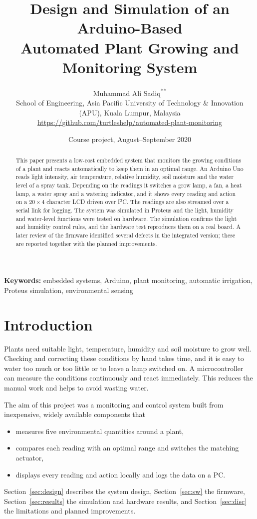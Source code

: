\documentclass[10pt,twocolumn,a4paper]{article}
\title{\vspace{-6mm}\Large\bfseries Design and Simulation of an Arduino-Based\\ Automated Plant Growing and Monitoring System}
\author{Muhammad Ali Sadiq\textsuperscript{**}\\
\small School of Engineering, Asia Pacific University of Technology \& Innovation (APU), Kuala Lumpur, Malaysia\\
\small \url{https://github.com/turtleshelp/automated-plant-monitoring}}
\date{\small Course project, August--September 2020}
\begin{document}
\maketitle
\begingroup\renewcommand\thefootnote{**}
\endgroup

\begin{abstract}
\noindent This paper presents a low-cost embedded system that monitors the growing conditions of a plant and reacts automatically to keep them in an optimal range. An Arduino Uno reads light intensity, air temperature, relative humidity, soil moisture and the water level of a spray tank. Depending on the readings it switches a grow lamp, a fan, a heat lamp, a water spray and a watering indicator, and it shows every reading and action on a $20\times4$ character LCD driven over I$^2$C. The readings are also streamed over a serial link for logging. The system was simulated in Proteus and the light, humidity and water-level functions were tested on hardware. The simulation confirms the light and humidity control rules, and the hardware test reproduces them on a real board. A later review of the firmware identified several defects in the integrated version; these are reported together with the planned improvements.
\end{abstract}

\noindent\textbf{Keywords:} embedded systems, Arduino, plant monitoring, automatic irrigation, Proteus simulation, environmental sensing

\section{Introduction}
Plants need suitable light, temperature, humidity and soil moisture to grow well. Checking and correcting these conditions by hand takes time, and it is easy to water too much or too little or to leave a lamp switched on. A microcontroller can measure the conditions continuously and react immediately. This reduces the manual work and helps to avoid wasting water.

The aim of this project was a monitoring and control system built from inexpensive, widely available components that
\begin{itemize}\setlength\itemsep{0pt}
\item measures five environmental quantities around a plant,
\item compares each reading with an optimal range and switches the matching actuator,
\item displays every reading and action locally and logs the data on a PC.
\end{itemize}
Section~\ref{sec:design} describes the system design, Section~\ref{sec:sw} the firmware, Section~\ref{sec:results} the simulation and hardware results, and Section~\ref{sec:disc} the limitations and planned improvements.
\end{document}
